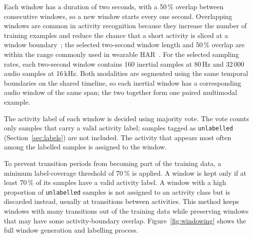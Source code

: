Each window has a duration of two seconds, with a 50\,\% overlap between
consecutive windows, so a new window starts every one second. Overlapping
windows are common in activity recognition because they increase the number of
training examples and reduce the chance that a short activity is sliced at a
window boundary~\cite{bulling2014tutorial}; the selected two-second window
length and 50\,\% overlap are within the range commonly used in wearable
HAR~\cite{banos2014window}. For the selected sampling rates, each two-second
window contains 160 inertial samples at 80\,Hz and 32\,000 audio samples at
16\,kHz. Both modalities are segmented using the same temporal boundaries on
the shared timeline, so each inertial window has a corresponding audio window
of the same span; the two together form one paired multimodal example.

The activity label of each window is decided using majority vote. The vote
counts only samples that carry a valid activity label; samples tagged as
\texttt{unlabelled} (Section~\ref{sec:labels}) are not included. The activity
that appears most often among the labelled samples is assigned to the window.

To prevent transition periods from becoming part of the training data, a
minimum label-coverage threshold of 70\,\% is applied. A window is kept only if
at least 70\,\% of its samples have a valid activity label. A window with a high
proportion of \texttt{unlabelled} samples is not assigned to an activity class
but is discarded instead, usually at transitions between activities. This
method keeps windows with many transitions out of the training data while
preserving windows that may have some activity-boundary overlap.
Figure~\ref{fig:windowing} shows the full window generation and labelling
process.

